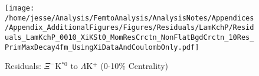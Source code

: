 \documentclass[/home/jesse/Analysis/FemtoAnalysis/AnalysisNotes/AnalysisNoteJBuxton.tex]{subfiles}
\begin{document}
\begin{figure}[h]
  \centering
  \texttt{[image: /home/jesse/Analysis/FemtoAnalysis/AnalysisNotes/Appendices/Appendix\_AdditionalFigures/Figures/Residuals/LamKchP/Residuals\_LamKchP\_0010\_XiKSt0\_MomResCrctn\_NonFlatBgdCrctn\_10Res\_PrimMaxDecay4fm\_UsingXiDataAndCoulombOnly.pdf]}
  \caption[Residuals: $\Xi^{-}$K$^{*0}$ to $\Lambda$K$^{+}$ (0-10\% Centrality)]{Residuals: $\Xi^{-}$K$^{*0}$ to $\Lambda$K$^{+}$ (0-10\% Centrality)}
  \label{fig:Res_LamKchP_0010_XiCKSt0}
\end{figure}
\end{document}
